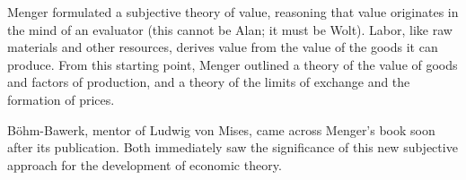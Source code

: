 Menger formulated a subjective theory of value, reasoning that value originates in the mind of an evaluator (this cannot be Alan; it must be Wolt). Labor, like raw materials and other resources, derives value from the value of the goods it can produce. From this starting point, Menger outlined a theory of the value of goods and factors of production, and a theory of the limits of exchange and the formation of prices.

Böhm-Bawerk, mentor of Ludwig von Mises, came across Menger’s book soon after its publication. Both immediately saw the significance of this new subjective approach for the development of economic theory.
